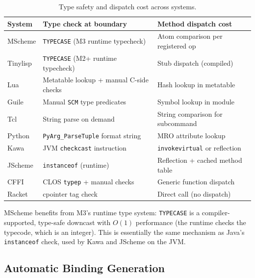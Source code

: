 \documentclass[11pt]{article}
\begin{document}
\begin{table}[ht]
\centering
\small
\begin{tabular}{@{}lll@{}}
\toprule
System   & Type check at boundary                 & Method dispatch cost \\
\midrule
MScheme  & \texttt{TYPECASE} (M3 runtime typecheck)      & Atom comparison per registered op \\
Tinylisp & \texttt{TYPECASE} (M2+ runtime typecheck)     & Stub dispatch (compiled) \\
Lua      & Metatable lookup + manual C-side checks & Hash lookup in metatable \\
Guile    & Manual \texttt{SCM} type predicates           & Symbol lookup in module \\
Tcl      & String parse on demand                 & String comparison for subcommand \\
Python   & \texttt{PyArg\_ParseTuple} format string       & MRO attribute lookup \\
Kawa     & JVM \texttt{checkcast} instruction            & \texttt{invokevirtual} or reflection \\
JScheme  & \texttt{instanceof} (runtime)                 & Reflection + cached method table \\
CFFI     & CLOS \texttt{typep} + manual checks           & Generic function dispatch \\
Racket   & cpointer tag check                     & Direct call (no dispatch) \\
\bottomrule
\end{tabular}
\caption{Type safety and dispatch cost across systems.}
\label{tab:type-safety}
\end{table}

MScheme benefits from M3's runtime type system: \texttt{TYPECASE} is a
compiler-supported, type-safe downcast with $O(1)$ performance (the
runtime checks the typecode, which is an integer).  This is
essentially the same mechanism as Java's \texttt{instanceof} check,
used by Kawa and JScheme on the JVM.


\subsection{Automatic Binding Generation}
\label{sec:auto-binding}
\end{document}
